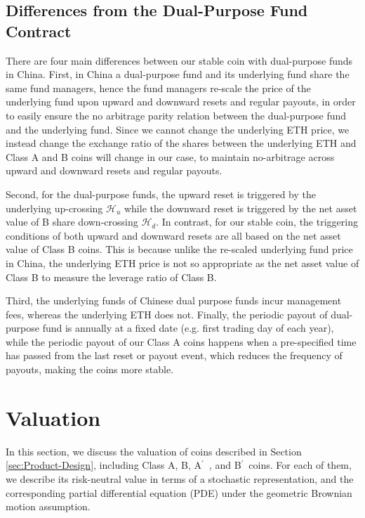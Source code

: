 \documentclass[draft, noinfoline]{ectaart}
\numberwithin{equation}{section}
\theoremstyle{plain}
\newcommand{\Ap}{A\ensuremath{^\prime}~}
\newcommand{\Bp}{B\ensuremath{^\prime}~}
\begin{document}
\subsection{Differences from the Dual-Purpose Fund Contract}

There are four main differences between our stable coin with dual-purpose funds in China. First, in China a dual-purpose fund and its underlying fund share the same fund managers, hence the fund managers re-scale the price of the underlying fund upon upward and downward resets and regular payouts, in order to easily ensure the no arbitrage parity relation between the dual-purpose fund and the underlying fund. Since we cannot change the underlying ETH price, we instead change the exchange ratio of the shares between the underlying ETH and Class A and B coins will change in our case, to maintain no-arbitrage across upward and downward resets and regular payouts.
 
 Second, for the dual-purpose funds, the upward reset is triggered by the underlying up-crossing $\mathcal{H}_u$ while the downward reset is triggered by the net asset value of B share down-crossing $\mathcal{H}_d$. In contrast, for our stable coin, the triggering conditions of both upward and downward resets are all based on the net asset value of Class B coins. This is because unlike the re-scaled underlying fund price in China, the underlying ETH price is not so appropriate as the net asset value of Class B to measure the leverage ratio of Class B.
 
 Third, the underlying funds of Chinese dual purpose funds incur management fees, whereas the underlying ETH does not. Finally, the periodic payout of dual-purpose fund is annually at a fixed date (e.g. first trading day of each year), while the periodic payout of our Class A coins happens when a pre-specified time has passed from the last reset or payout event, which reduces the frequency of payouts, making the coins more stable.



\section{Valuation}\label{sect:valuation}

In this section, we discuss the valuation of coins described in Section \ref{sec:Product-Design}, including Class A, B, \Ap, and \Bp coins. For each of them, we describe its risk-neutral value in terms of a stochastic representation, and the corresponding partial differential equation (PDE) under the geometric Brownian motion assumption.
\end{document}
